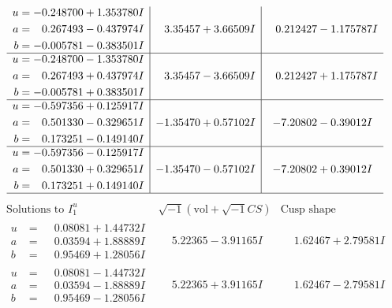 \documentclass[1p]{elsarticle_modified}
\theoremstyle{definition}
\newcommand{\I}{\sqrt{-1}}
\begin{document}
$$\begin{array}{c|c|c}
\begin{aligned}
u &= -0.248700 + 1.353780 I \\
a &= \phantom{-}0.267493 - 0.437974 I \\
b &= -0.005781 - 0.383501 I\end{aligned}
 & \phantom{-}3.35457 + 3.66509 I & \phantom{-}0.212427 - 1.175787 I \\ \hline\begin{aligned}
u &= -0.248700 - 1.353780 I \\
a &= \phantom{-}0.267493 + 0.437974 I \\
b &= -0.005781 + 0.383501 I\end{aligned}
 & \phantom{-}3.35457 - 3.66509 I & \phantom{-}0.212427 + 1.175787 I \\ \hline\begin{aligned}
u &= -0.597356 + 0.125917 I \\
a &= \phantom{-}0.501330 - 0.329651 I \\
b &= \phantom{-}0.173251 - 0.149140 I\end{aligned}
 & -1.35470 + 0.57102 I & -7.20802 - 0.39012 I \\ \hline\begin{aligned}
u &= -0.597356 - 0.125917 I \\
a &= \phantom{-}0.501330 + 0.329651 I \\
b &= \phantom{-}0.173251 + 0.149140 I\end{aligned}
 & -1.35470 - 0.57102 I & -7.20802 + 0.39012 I\\
 \hline 
 \end{array}$$\newpage$$\begin{array}{c|c|c}  
\text{Solutions to }I^u_{1}& \I (\text{vol} + \sqrt{-1}CS) & \text{Cusp shape}\\
 \hline 
\begin{aligned}
u &= \phantom{-}0.08081 + 1.44732 I \\
a &= \phantom{-}0.03594 + 1.88889 I \\
b &= \phantom{-}0.95469 + 1.28056 I\end{aligned}
 & \phantom{-}5.22365 - 3.91165 I & \phantom{-}1.62467 + 2.79581 I \\ \hline\begin{aligned}
u &= \phantom{-}0.08081 - 1.44732 I \\
a &= \phantom{-}0.03594 - 1.88889 I \\
b &= \phantom{-}0.95469 - 1.28056 I\end{aligned}
 & \phantom{-}5.22365 + 3.91165 I & \phantom{-}1.62467 - 2.79581 I \\ \hline\begin{aligned}

\end{aligned}
\end{array}$$
\end{document}
